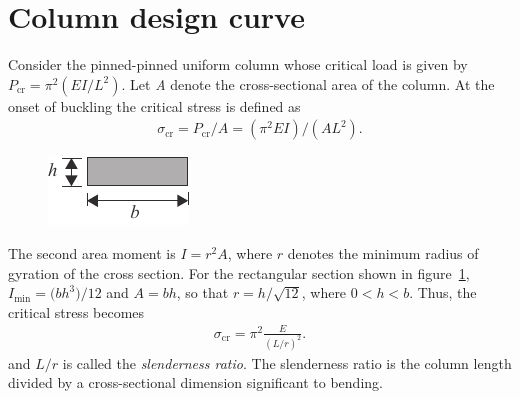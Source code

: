 \documentclass{AeroStructure-ERJohnson}
\begin{document}
\vspace*{-1pc}

\section{Column design curve}\label{sec11.5}

Consider the pinned-pinned uniform column whose critical load is given by $P_{\textrm{cr}}=\pi^{2}\left(E I/L^{2}\right)$. Let \textit{A} denote the cross-sectional area of the column. At the onset of buckling the critical stress is defined as%
\begin{align}\label{eq11.90}
\sigma_{\textrm{cr}}=P_{\textrm{cr}}/A=\left(\pi^{2} E I\right) /\left(A L^{2}\right).
\end{align}

\begin{figure}
\includegraphics{Figure_11-17.pdf}
\caption{ \label{fig11.17}}
\end{figure}

\vspace*{-1pc}

\noindent The second area moment is $I=r^{2} A$, where $r$ denotes the minimum radius of gyration of the cross section. For the rectangular section shown in figure~\ref{fig11.17}, $I_{\min}=\big(b h^{3}\big)/12$ and $A=b h$, so that $r=h/ \sqrt{12}$, where $0<h<b$. Thus, the critical stress becomes
\begin{align}\label{eq11.91}
\sigma_{\textrm{cr}}=\pi^{2} \frac{E}{(L/r)^{2}}.
\end{align}
and $L/r$ is called the \textit{slenderness ratio}. The slenderness ratio is the column length divided by a cross-sectional dimension significant to bending.
\end{document}
